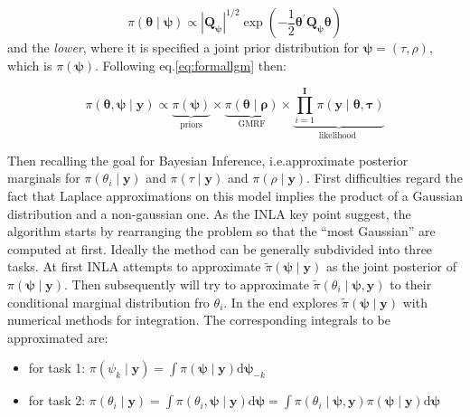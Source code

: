 \documentclass[
  12pt,
  a4paper,
  oneside]{book}
\providecommand{\tightlist}{%
  \setlength{\itemsep}{0pt}\setlength{\parskip}{0pt}}
\theoremstyle{definition}
\theoremstyle{definition}
\theoremstyle{definition}
\theoremstyle{remark}
\begin{document}
\[
\pi(\boldsymbol{\theta} \mid \boldsymbol{\psi}) \propto\left|\boldsymbol{Q}_{\boldsymbol{\psi}}\right|^{1 / 2} \exp \left(-\frac{1}{2} \boldsymbol{\theta}^{\prime} \boldsymbol{Q}_{\boldsymbol{\psi}} \boldsymbol{\theta}\right)
\]
and the \emph{lower}, where it is specified a joint prior distribution for \(\boldsymbol\psi = (\tau, \rho)\), which is \(\pi(\boldsymbol\psi)\). Following eq.\eqref{eq:formallgm} then:

\begin{equation}
\pi(\boldsymbol{\theta}, \boldsymbol{\psi} \mid \mathbf{y})\propto  \underbrace{\pi(\boldsymbol{\psi})}_{\text {priors}} \times \underbrace{\pi(\boldsymbol\theta \mid \boldsymbol\rho)}_{\text {GMRF}} \times \underbrace{\prod_{i=1}^{\mathbf{I}} \pi\left(\mathbf{y} \mid \boldsymbol\theta, \boldsymbol{\tau}\right)}_{\text {likelihood }}
\label{eq:poissonlgm}
\end{equation}

Then recalling the goal for Bayesian Inference, i.e.approximate posterior marginals for \(\pi\left(\theta_{i} \mid \mathbf{y}\right)\) and \(\pi\left(\tau \mid \boldsymbol{\mathbf{y}}\right)\) and \(\pi\left(\rho \mid \boldsymbol{\mathbf{y}}\right)\). First difficulties regard the fact that Laplace approximations on this model implies the product of a Gaussian distribution and a non-gaussian one. As the INLA key point suggest, the algorithm starts by rearranging the problem so that the ``most Gaussian'' are computed at first.
Ideally the method can be generally subdivided into three tasks. At first INLA attempts to approximate \(\tilde{\pi}(\boldsymbol{\psi} \mid \boldsymbol{\mathbf{y}})\) as the joint posterior of \({\pi}(\boldsymbol{\psi} \mid \boldsymbol{\mathbf{y}})\). Then subsequently will try to approximate \(\tilde{\pi}\left(\theta_{i} \mid \boldsymbol\psi, \mathbf{y}\right)\) to their conditional marginal distribution fro \(\theta_i\). In the end explores \(\tilde{\pi}(\boldsymbol{\psi} \mid \boldsymbol{\mathbf{y}})\) with numerical methods for integration.
The corresponding integrals to be approximated are:

\begin{itemize}
\tightlist
\item
  for task 1: \(\pi\left(\psi_{k} \mid \boldsymbol{\mathbf{y}}\right)=\int \pi(\boldsymbol{\psi} \mid \boldsymbol{\mathbf{y}}) \mathrm{d} \boldsymbol{\psi}_{-k}\)
\item
  for task 2: \(\pi\left(\theta_{i} \mid \boldsymbol{\mathbf{y}}\right)=\int \pi\left(\theta_{i}, \boldsymbol{\psi} \mid \boldsymbol{\mathbf{y}}\right) \mathrm{d} \boldsymbol{\psi}=\int \pi\left(\theta_{i} \mid \boldsymbol{\psi}, \boldsymbol{\mathbf{y}}\right) \pi(\boldsymbol{\psi} \mid \boldsymbol{\mathbf{y}}) \mathrm{d} \boldsymbol{\psi}\)
\end{itemize}
\end{document}

